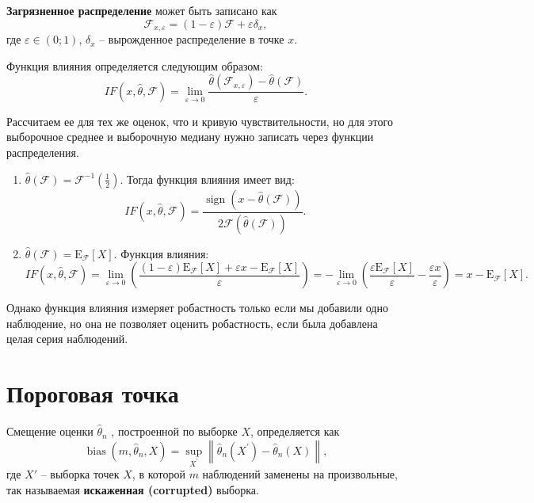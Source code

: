 \documentclass[specialist,
substylefile = spbu.rtx,
               subf,href,colorlinks=true, 12pt]{disser}
\DeclareMathOperator{\sign}{sign}
\begin{document}
\textbf{Загрязненное распределение} \cite{Hampel} может быть записано как
\begin{equation}
\mathcal{F}_{x,\varepsilon} = (1 - \varepsilon) \mathcal{F} + \varepsilon \delta_x,
\label{eq:distr}
\end{equation}
где $\varepsilon \in (0; 1)$, $\delta_x$ -- вырожденное распределение в точке $x$.

Функция влияния \cite{Hampel} определяется следующим образом:
\begin{equation}
IF(x, \widehat {\theta}, \mathcal{F})=\lim\limits_{\varepsilon\to 0}\frac{\widehat {\theta}(\mathcal{F}_{x,\varepsilon})-\widehat {\theta}(\mathcal{F})}{\varepsilon}.
\label{eq:inf_fun}
\end{equation}

Рассчитаем ее для тех же оценок, что и кривую чувствительности, но для этого выборочное среднее и выборочную медиану нужно записать через функции распределения. 

\begin{enumerate}
     \item $\widehat {\theta}(\mathcal{F})=\mathcal{F}^{-1}\left( \frac{1}{2}\right)$.
     Тогда функция влияния имеет вид:
     \[IF(x, \widehat {\theta}, \mathcal{F})=\frac{\sign(x-\widehat {\theta}(\mathcal{F}))}{2\mathcal{F}(\widehat {\theta}(\mathcal{F}))}.\]
      
       \item $\widehat {\theta}(\mathcal{F})=\mathrm{E}_{\mathcal{F}}[X]$. Функция влияния:
\begin{dmath*}
IF (x, \widehat {\theta}, \mathcal{F})=\lim\limits_{\varepsilon\to 0}\left(\frac{(1-\varepsilon)\mathrm{E}_{\mathcal{F}}[X]+\varepsilon x-\mathrm{E}_{\mathcal{F}}[X]}{\varepsilon}\right)=
-\lim\limits_{\varepsilon\to 0}\left(\frac{\varepsilon \mathrm{E}_{\mathcal{F}}[X]}{\varepsilon}-\frac{\varepsilon x}{\varepsilon}\right)=
x-\mathrm{E}_{\mathcal{F}}[X].
\end{dmath*} 
\end{enumerate}

Однако функция влияния измеряет робастность только если мы добавили одно наблюдение, но она не позволяет оценить робастность, если была добавлена целая серия наблюдений.

\section{Пороговая точка}

Смещение оценки $\widehat {\theta}_n$ \cite{Diakonikolas}, построенной по выборке $X$, определяется как
\begin{equation}
\operatorname{bias}\left(m, \widehat {\theta}_n, X\right)=\sup _{X^{\prime}}\left\|\widehat {\theta}_n\left(X^{\prime}\right)-\widehat {\theta}_n(X)\right\|,
\label{eq:bias}
\end{equation}
где $X'$ -- выборка точек $X$, в которой $m$ наблюдений заменены на произвольные, так называемая \textbf{искаженная (corrupted)} \cite{Diakonikolas} выборка.
\end{document}
